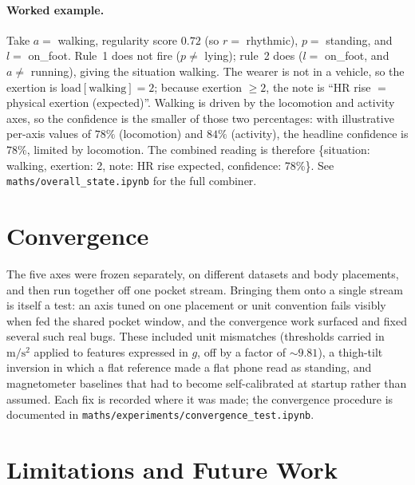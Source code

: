 \documentclass[11pt]{article}
\newcommand{\nb}[1]{\texttt{#1}}            %
\begin{document}
\paragraph{Worked example.}
Take $a =$ walking, regularity score $0.72$ (so $r =$ rhythmic), $p =$ standing, and
$l =$ on\_foot. Rule~1 does not fire ($p \neq$ lying); rule~2 does ($l =$ on\_foot, and
$a \neq$ running), giving the situation \textsf{walking}. The wearer is not in a vehicle,
so the exertion is $\mathrm{load}[\text{walking}] = 2$; because exertion $\ge 2$, the note
is ``HR rise $=$ physical exertion (expected)''. Walking is driven by the locomotion and
activity axes, so the confidence is the smaller of those two percentages: with
illustrative per-axis values of $78\%$ (locomotion) and $84\%$ (activity), the headline
confidence is $78\%$, limited by locomotion. The combined reading is therefore
\{situation: walking, exertion: 2, note: HR rise expected, confidence: 78\%\}. See
\nb{maths/overall\_state.ipynb} for the full combiner.

\section{Convergence}

The five axes were frozen separately, on different datasets and body placements, and
then run together off one pocket stream. Bringing them onto a single stream is itself a
test: an axis tuned on one placement or unit convention fails visibly when fed the
shared pocket window, and the convergence work surfaced and fixed several such real
bugs. These included unit mismatches (thresholds carried in $\mathrm{m/s^2}$ applied to
features expressed in $g$, off by a factor of $\sim 9.81$), a thigh-tilt inversion in
which a flat reference made a flat phone read as standing, and magnetometer baselines
that had to become self-calibrated at startup rather than assumed. Each fix is recorded
where it was made; the convergence procedure is documented in
\nb{maths/experiments/convergence\_test.ipynb}.

\section{Limitations and Future Work}
\end{document}
